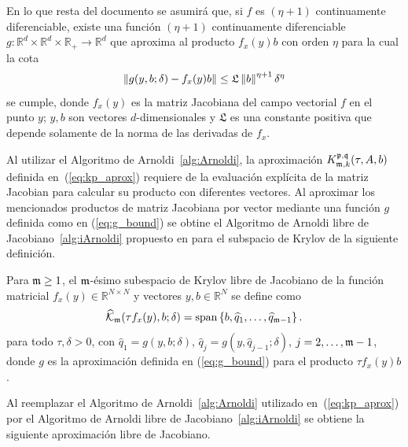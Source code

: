 En lo que resta del documento se asumirá que, si $f$ es $(\eta+1)$  continuamente diferenciable, existe una función $(\eta+1)$ continuamente diferenciable $g: \mathbb{R}^{d}\times \mathbb{R}^{d} \times \mathbb{R}_+ \to \mathbb{R}^{d}$ que aproxima al producto $f_x(y)b$ con orden $\eta$ para la cual la cota
\begin{equation} \label{eq:g_bound}
	\left\lVert g(y,b;\delta)-f_x(y)b \right\rVert \leq \mathfrak{L}\left\lVert b \right\rVert^{\eta+1}\delta^{\eta}
\end{equation}
se cumple, donde $f_x(y)$ es la matriz Jacobiana del campo vectorial $f$ en el punto $y$; $y,b$ son vectores $d$-dimensionales y $\mathfrak{L}$ es una constante positiva que depende solamente de la norma de las derivadas de $f_x$.

Al utilizar el Algoritmo de Arnoldi~\ref{alg:Arnoldi}, la aproximación $K_{\mathfrak{m},k}^{\mathfrak{p},\mathfrak{q}}(\tau,A,b)$ definida en~(\ref{eq:kp_aprox}) requiere de la evaluación explícita de la matriz Jacobian para calcular su producto con diferentes vectores. Al aproximar los mencionados productos de matriz Jacobiana por vector mediante una función $g$ definida como en (\ref{eq:g_bound}) se obtine el Algoritmo de Arnoldi libre de Jacobiano~\ref{alg:iArnoldi} propuesto en \cite{brown1987local} para el subspacio de Krylov de la siguiente definición. 

\begin{definition}
	\cite{brown1987local} Para $\mathfrak{m}\geq 1$, el $\mathfrak{m}$-ésimo subespacio de Krylov libre de Jacobiano de la función matricial $f_x(y)\in\mathbb{R}^{N\times N}$
	y vectores $y,b\in\mathbb{R}^{N}$ se define como
	\[ \widehat{\mathcal{K}}_{\mathfrak{m}}(\tau f_x(y),b;\delta)=\mathrm{span} \left\{ b,\widehat{q}_1,\ldots,\widehat{q}_{\mathfrak{m}-1} \right\}. \]
	para todo $\tau, \delta > 0$, con $\widehat{q}_1=g(y,b;\delta)$, $\widehat{q}_j=g(y,\widehat{q}_{j-1};\delta)$, $j=2,\ldots,\mathfrak{m}-1$, donde $g$ es la aproximación definida en (\ref{eq:g_bound}) para el producto $\tau f_x(y)b$.
\end{definition}

Al reemplazar el Algoritmo de Arnoldi~\ref{alg:Arnoldi} utilizado en~(\ref{eq:kp_aprox}) por el Algoritmo de Arnoldi libre de Jacobiano~\ref{alg:iArnoldi} se obtiene la siguiente aproximación libre de Jacobiano.


